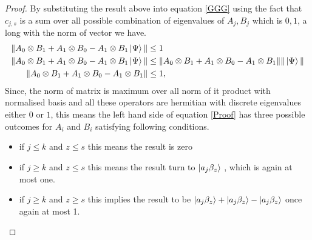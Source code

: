 \begin{proof}
By substituting the result above into equation \ref{GGG}  using the fact that $c_{j,s}$ is a sum over all possible combination of eigenvalues of $A_j,B_j$ which is $0,1$, a long with the  norm of vector we have.
\begin{align}\label{Proof}
\| A_0\otimes B_1+A_1\otimes B_0-A_1\otimes B_1 \ket{\Psi} \| & \leq 1\nonumber\\
\| A_0\otimes B_1+A_1\otimes B_0-A_1\otimes B_1 \ket{\Psi} \|& \leq \| A_0\otimes B_1+A_1\otimes B_0-A_1\otimes B_1\| \| \ket{\Psi} \|\nonumber\\
\| A_0\otimes B_1+A_1\otimes B_0-A_1\otimes B_1\|& \leq  1,
\end{align}
Since, the norm of matrix is maximum over all norm of it product with normalised basis and all these operators are hermitian with discrete eigenvalues either $0$ or $1$, this means the left hand side of equation \ref{Proof} has three possible outcomes for $A_i$ and $B_i$ satisfying following conditions.
\begin{itemize}
\item if $j\leq k$ and $z\leq s$ this means the result is zero
\item if $j\geqslant k$ and $z\leq s$ this means the result turn to $\ket{a_j \beta_z}$ , which is again at most one.
\item if $j\geqslant k$ and $z\geqslant s$ this implies the result to be $\ket{a_j \beta_z}+ \ket{a_j \beta_z}- \ket{a_j \beta_z}$ once again at most 1.
\end{itemize}
\end{proof}